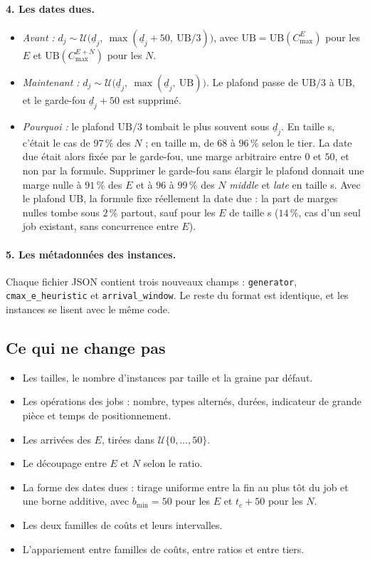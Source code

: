 \documentclass[11pt,a4paper]{article}
\newcommand{\UB}{\mathrm{UB}}
\begin{document}
\paragraph{4. Les dates dues.}
\begin{itemize}
  \item \emph{Avant :} $d_j \sim \mathcal{U}\big(\underline{d}_j,\ \max(\underline{d}_j + 50,\ \UB/3)\big)$, avec $\UB = \UB(C^E_{\max})$ pour les $E$ et $\UB(C^{E+N}_{\max})$ pour les $N$.
  \item \emph{Maintenant :} $d_j \sim \mathcal{U}\big(\underline{d}_j,\ \max(\underline{d}_j,\ \UB)\big)$. Le plafond passe de $\UB/3$ à $\UB$, et le garde-fou $\underline{d}_j + 50$ est supprimé.
  \item \emph{Pourquoi :} le plafond $\UB/3$ tombait le plus souvent sous $\underline{d}_j$. En taille s, c'était le cas de $97\,\%$ des $N$ ; en taille m, de $68$ à $96\,\%$ selon le tier. La date due était alors fixée par le garde-fou, une marge arbitraire entre $0$ et $50$, et non par la formule. Supprimer le garde-fou sans élargir le plafond donnait une marge nulle à $91\,\%$ des $E$ et à $96$ à $99\,\%$ des $N$ \emph{middle} et \emph{late} en taille s. Avec le plafond $\UB$, la formule fixe réellement la date due : la part de marges nulles tombe sous $2\,\%$ partout, sauf pour les $E$ de taille s ($14\,\%$, cas d'un seul job existant, sans concurrence entre $E$).
\end{itemize}

\paragraph{5. Les métadonnées des instances.}
Chaque fichier JSON contient trois nouveaux champs : \texttt{generator}, \texttt{cmax\_e\_heuristic} et \texttt{arrival\_window}.
Le reste du format est identique, et les instances se lisent avec le même code.

\subsection{Ce qui ne change pas}

\begin{itemize}
  \item Les tailles, le nombre d'instances par taille et la graine par défaut.
  \item Les opérations des jobs : nombre, types alternés, durées, indicateur de grande pièce et temps de positionnement.
  \item Les arrivées des $E$, tirées dans $\mathcal{U}\{0,\dots,50\}$.
  \item Le découpage entre $E$ et $N$ selon le ratio.
  \item La forme des dates dues : tirage uniforme entre la fin au plus tôt du job et une borne additive, avec $b_{\min} = 50$ pour les $E$ et $t_c + 50$ pour les $N$.
  \item Les deux familles de coûts et leurs intervalles.
  \item L'appariement entre familles de coûts, entre ratios et entre tiers.
\end{itemize}
\end{document}
